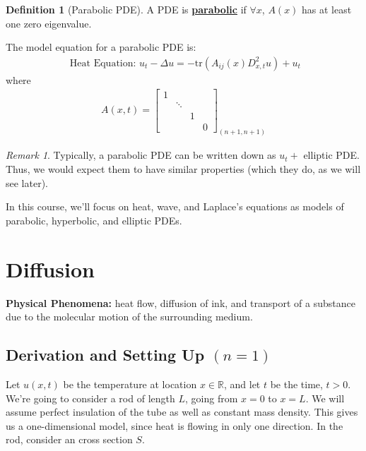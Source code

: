 \documentclass[11pt]{scrartcl}
\theoremstyle{definition}
\newtheorem{definition}{Definition}
\theoremstyle{remark}
\newtheorem{remark}{Remark}
\newcommand{\dfn}[1]{\textbf{\underline{#1}}}
\newcommand{\R}[0]{\mathbb{R}}
\begin{document}
\begin{definition}[Parabolic PDE]
	A PDE is \dfn{parabolic} if $\forall x$, $A(x)$ has at least one zero eigenvalue. 
\end{definition}

The model equation for a parabolic PDE is: 
\begin{align}
	\text{ Heat Equation: } u_t - \Delta u = - \text{tr}(A_{ij}(x) D_{x,t}^2 u) + u_t 	
\end{align}
where 
\begin{align}
	A(x,t) = 	\begin{bmatrix}
		1 &  &  & \\
		  & \ddots & & \\
		  &  &  1 & \\
		  & & & 0
	\end{bmatrix}_{(n+1, n+1)}	
\end{align}

\begin{remark}
	Typically, a parabolic PDE can be written down as $u_t + $ elliptic PDE. Thus, we would expect them to have similar properties (which they do, as we will see later). 
\end{remark}
In this course, we'll focus on heat, wave, and Laplace's equations as models of parabolic, hyperbolic, and elliptic PDEs. 

\section{Diffusion}
\textbf{Physical Phenomena:} heat flow, diffusion of ink, and transport of a substance due to the molecular motion of the surrounding medium. 

\subsection{Derivation and Setting Up $(n=1)$}
Let $u(x,t)$ be the temperature at location $x \in \R$, and let $t$ be the time, $t > 0$. We're going to consider a rod of length $L$, going from $x=0$ to $x=L$. We will assume perfect insulation of the tube as well as constant mass density. This gives us a one-dimensional model, since heat is flowing in only one direction. In the rod, consider an cross section $S$.   

%
\end{document}
